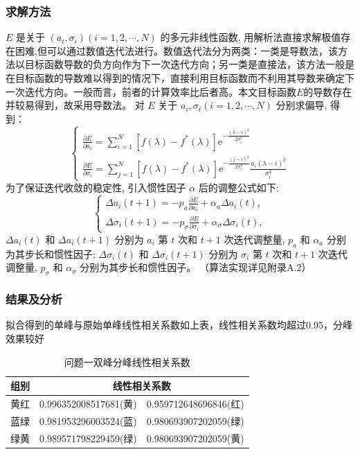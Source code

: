 \documentclass{article}
\numberwithin{equation}{subsection}
\begin{document}
\subsubsection{求解方法}
$E$ 是关于 $\left(a_{i}, \sigma_{i}\right)(i=1,2, \cdots, N)$ 的多元非线性函数, 用解析法直接求解极值存在困难,但可以通过数值迭代法进行。数值迭代法分为两类：一类是导数法，该方法以目标函数导数的负方向作为下一次迭代方向；另一类是直接法，该方法一般是在目标函数的导数难以得到的情况下，直接利用目标函数而不利用其导数来确定下一次迭代方向。一般而言，前者的计算效率比后者高\cite {最小二乘}。本文目标函数$E$的导数存在并较易得到，故采用导数法。
对 $E$ 关于 $a_{i}, \sigma_{i}(i=1,2, \cdots, N)$ 分别求偏导, 得到：
$$\begin{cases}
\frac{\partial E}{\partial a_{i}}=\sum\limits_{i=1}^{N}\left[f(\lambda )-f^{*}(\lambda )\right] \mathrm{e}^{-\frac{(\lambda -i)^{2}}{2 \sigma_{i}^{2}}} \\
\frac{\partial E}{\partial \sigma_{i}}=\sum\limits_{j=1}^{N}\left[f(\lambda)-f^{*}(\lambda)\right] \mathrm{e}^{-\frac{(j-i)^{2}}{2 \sigma_{i}^{2}}} \frac{a_{i}(\lambda-i)^{2}}{\sigma_{i}^{3}} 
\end{cases}$$
为了保证迭代收敛的稳定性, 引入惯性因子 $\alpha$ 后的调整公式如下:
$$\begin{cases}
\Delta a_{i}(t+1)=-p_{a} \frac{\partial E}{\partial a_{i}}+\alpha_{a} \Delta a_{i}(t), \\
\Delta \sigma_{i}(t+1)=-p_{\sigma} \frac{\partial E}{\partial \sigma_{i}}+\alpha_{\sigma} \Delta \sigma_{i}(t),
\end{cases}$$
$\Delta a_{i}(t)$ 和 $\Delta a_{i}(t+1)$ 分别为 $a_{i}$ 第 $t$ 次和 $t+1$ 次迭代调整量, $p_{a}$ 和 $\alpha_{a}$ 分别为其步长和惯性因子; $\Delta \sigma_{i}(t)$ 和 $\Delta \sigma_{i}(t+1)$ 分别为 $\sigma_{i}$ 第 $t$ 次和 $t+1$ 次迭代 调整量, $p_{\sigma}$ 和 $\alpha_{\sigma}$ 分别为其步长和惯性因子。\cite {最小二乘}
（算法实现详见附录A.2）
\subsubsection{结果及分析}
拟合得到的单峰与原始单峰线性相关系数如上表，线性相关系数均超过0.95，分峰效果较好

\begin{table}[h]
    \centering
    \begin{tabular}{|l|c|c|}\hline
        组别&\multicolumn{2}{c|}{线性相关系数}\\\hline
        黄红&0.996352008517681(黄)&0.959712648696846(红)\\
        蓝绿&0.981953296003524(蓝)&0.980693907202059(绿)\\
        绿黄&0.989571798229459(绿)&0.980693907202059(黄)\\
        \hline
    \end{tabular}
    \caption{问题一双峰分峰线性相关系数}
    \label{双峰分峰线性相关系数}
\end{table}
\end{document}
